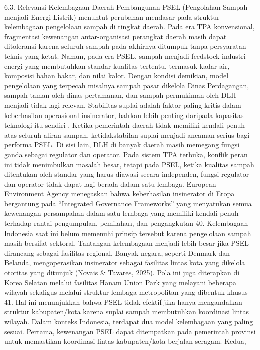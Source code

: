 \documentclass[
  letterpaper,
  DIV=11,
  numbers=noendperiod]{scrreprt}
\begin{document}
6.3. Relevansi Kelembagaan Daerah Pembangunan PSEL (Pengolahan Sampah
menjadi Energi Listrik) menuntut perubahan mendasar pada struktur
kelembagaan pengelolaan sampah di tingkat daerah. Pada era TPA
konvensional, fragmentasi kewenangan antar-organisasi perangkat daerah
masih dapat ditoleransi karena seluruh sampah pada akhirnya ditumpuk
tanpa persyaratan teknis yang ketat. Namun, pada era PSEL, sampah
menjadi feedstock industri energi yang membutuhkan standar kualitas
tertentu, termasuk kadar air, komposisi bahan bakar, dan nilai kalor.
Dengan kondisi demikian, model pengelolaan yang terpecah misalnya sampah
pasar dikelola Dinas Perdagangan, sampah taman oleh dinas pertamanan,
dan sampah permukiman oleh DLH menjadi tidak lagi relevan. Stabilitas
suplai adalah faktor paling kritis dalam keberhasilan operasional
insinerator, bahkan lebih penting daripada kapasitas teknologi itu
sendiri . Ketika pemerintah daerah tidak memiliki kendali penuh atas
seluruh aliran sampah, ketidakstabilan suplai menjadi ancaman serius
bagi performa PSEL. Di sisi lain, DLH di banyak daerah masih memegang
fungsi ganda sebagai regulator dan operator. Pada sistem TPA terbuka,
konflik peran ini tidak menimbulkan masalah besar, tetapi pada PSEL,
ketika kualitas sampah ditentukan oleh standar yang harus diawasi secara
independen, fungsi regulator dan operator tidak dapat lagi berada dalam
satu lembaga. European Environment Agency menegaskan bahwa keberhasilan
insinerator di Eropa bergantung pada ``Integrated Governance
Frameworks'' yang menyatukan semua kewenangan persampahan dalam satu
lembaga yang memiliki kendali penuh terhadap rantai pengumpulan,
pemilahan, dan pengangkutan 40. Kelembagaan Indonesia saat ini belum
memenuhi prinsip tersebut karena pengelolaan sampah masih bersifat
sektoral. Tantangan kelembagaan menjadi lebih besar jika PSEL dirancang
sebagai fasilitas regional. Banyak negara, seperti Denmark dan Belanda,
mengoperasikan insinerator sebagai fasilitas lintas kota yang dikelola
otoritas yang ditunjuk (Novais \& Tavares, 2025). Pola ini juga
diterapkan di Korea Selatan melalui fasilitas Hanam Union Park yang
melayani beberapa wilayah sekaligus melalui struktur lembaga
metropolitan yang dibentuk khusus 41. Hal ini menunjukkan bahwa PSEL
tidak efektif jika hanya mengandalkan struktur kabupaten/kota karena
suplai sampah membutuhkan koordinasi lintas wilayah. Dalam konteks
Indonesia, terdapat dua model kelembagaan yang paling sesuai. Pertama,
kewenangan PSEL dapat ditempatkan pada pemerintah provinsi untuk
memastikan koordinasi lintas kabupaten/kota berjalan seragam. Kedua,
\end{document}
